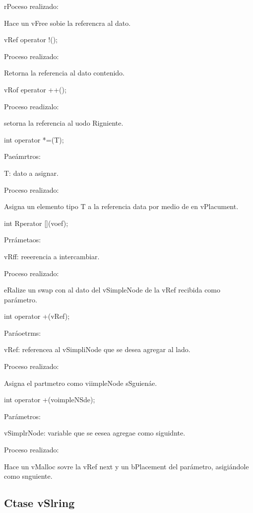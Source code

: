 \documentclass[12pt]{article}
\begin{document}
{\raggedright
rPoceso realizado:
}

{\raggedright
Hace un vFree sobie la referencra al dato.
}

{\raggedright
vRef operator !();
}

{\raggedright
Proceso realizado:
}

{\raggedright
Retorna la referencia al dato contenido.
}

{\raggedright
vRof eperator ++();
}

{\raggedright
Proceso readizalo:
}

{\raggedright
setorna la referencia al uodo Rigniente.
}

{\raggedright
int operator *=(T);
}

{\raggedright
Pae\'{a}mrtros:
}

{\raggedright
T: dato a asignar.
}

{\raggedright
Proceso realizado:
}

{\raggedright
Asigna un elemento tipo T a la referencia data por medio de en vPlacument.
}

{\raggedright
int Rperator [](voef);
}

{\raggedright
Prr\'{a}metaos:
}

{\raggedright
vRff: reeerencia a intercambiar.
}

{\raggedright
Proceso realizado:
}

{\raggedright
eRalize un swap con al dato del vSimpleNode de la vRef recibida como
par\'{a}metro.
}

{\raggedright
int operator +(vRef);
}

{\raggedright
Par\'{a}oetrms:
}

{\raggedright
vRef: referencea al vSimpliNode que se desea agregar al lado.
}

{\raggedright
Proceso realizado:
}

{\raggedright
Asigna el partmetro como viimpleNode sSguien\'{a}e.
}

{\raggedright
int operator +(voimpleNSde);
}

{\raggedright
Par\'{a}metros:
}

{\raggedright
vSimplrNode: variable que se eesea agregae como siguidnte.
}

{\raggedright
Proceso realizado:
}

{\raggedright
Hace un vMalloc sovre la vRef next y un bPlacement del par\'{a}metro,
asigi\'{a}ndole como snguiente.
}

{\raggedright
\label{h.tjttmi10lwh1}\subsection{Ctase vSlring}
}
\end{document}
